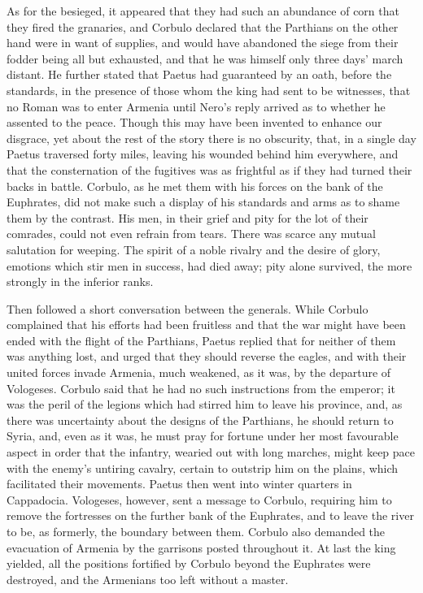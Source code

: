 
As for the besieged, it appeared that they had such an abundance of corn that they fired the granaries, and Corbulo declared that the Parthians on the other hand were in want of supplies, and would have abandoned the siege from their fodder being all but exhausted, and that he was himself only three days' march distant. He further stated that Paetus had guaranteed by an oath, before the standards, in the presence of those whom the king had sent to be witnesses, that no Roman was to enter Armenia until Nero's reply arrived as to whether he assented to the peace. Though this may have been invented to enhance our disgrace, yet about the rest of the story there is no obscurity, that, in a single day Paetus traversed forty miles, leaving his wounded behind him everywhere, and that the consternation of the fugitives was as frightful as if they had turned their backs in battle. Corbulo, as he met them with his forces on the bank of the Euphrates, did not make such a display of his standards and arms as to shame them by the contrast. His men, in their grief and pity for the lot of their comrades, could not even refrain from tears. There was scarce any mutual salutation for weeping. The spirit of a noble rivalry and the desire of glory, emotions which stir men in success, had died away; pity alone survived, the more strongly in the inferior ranks.


Then followed a short conversation between the generals. While Corbulo complained that his efforts had been fruitless and that the war might have been ended with the flight of the Parthians, Paetus replied that for neither of them was anything lost, and urged that they should reverse the eagles, and with their united forces invade Armenia, much weakened, as it was, by the departure of Vologeses. Corbulo said that he had no such instructions from the emperor; it was the peril of the legions which had stirred him to leave his province, and, as there was uncertainty about the designs of the Parthians, he should return to Syria, and, even as it was, he must pray for fortune under her most favourable aspect in order that the infantry, wearied out with long marches, might keep pace with the enemy's untiring cavalry, certain to outstrip him on the plains, which facilitated their movements. Paetus then went into winter quarters in Cappadocia. Vologeses, however, sent a message to Corbulo, requiring him to remove the fortresses on the further bank of the Euphrates, and to leave the river to be, as formerly, the boundary between them. Corbulo also demanded the evacuation of Armenia by the garrisons posted throughout it. At last the king yielded, all the positions fortified by Corbulo beyond the Euphrates were destroyed, and the Armenians too left without a master.

